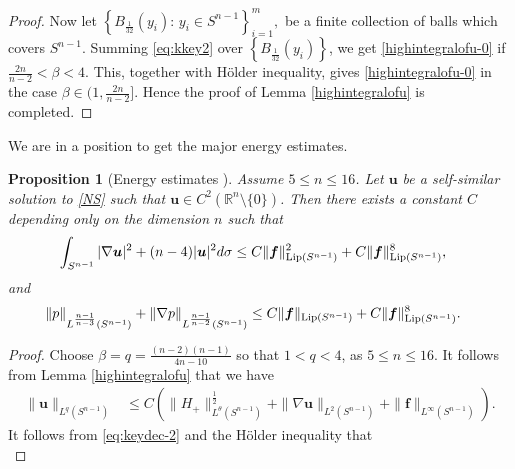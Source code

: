 \documentclass[12pt]{amsart}
\newtheorem{pro}[theorem]{Proposition}
\newcommand{\Bu}{{\boldsymbol{u}}}
\newcommand{\Bf}{{\boldsymbol{f}}}
\begin{document}
{\begin{proof}
		
		Now let $\left\{B_{\frac{1}{32}}(y_i): \, y_i 
		\in S^{n-1}\right\}_{i=1}^{m}, $ be a finite collection of balls which covers $S^{n-1}$. Summing \eqref{eq:kkey2} over $\left\{B_{\frac{1}{32}}(y_i)\right\}$, we get \eqref{highintegralofu-0} if $\frac{2n}{n-2}< \beta< 4$. This, together with H\"older inequality, gives \eqref{highintegralofu-0} in the case $\beta \in(1,  \frac{2n}{n-2}]$. Hence the proof of Lemma \ref{highintegralofu} is completed.
	\end{proof}
	
	
	
	
	
	We are in a position to get the major energy estimates.     
	\begin{pro}
		[Energy estimates ]\label{Energy estimates2}
		Assume $5\leq n\leq 16$. Let
		$\Bu$ be a  self-similar solution to \eqref{NS} such that $\Bu \in C^2(\mathbb{R}^n \setminus\{0\})$. Then there exists a constant $C$ depending only on the dimension $n$ such that
		\begin{equation}\label{eq:energyes3}
			\begin{aligned}
				\int_{S^{n-1}} |\nabla \Bu|^2 +(n-4)|\Bu|^2  d \sigma &\leq C \|\Bf\|_{\textnormal{Lip}(S^{n-1})}^2 + C \|\Bf\|_{\textnormal{Lip}(S^{n-1})}^{8},
			\end{aligned}
		\end{equation}
		and
		\begin{equation}\label{eq:energyes4}
			\begin{aligned}
				\| p\|_{L^{\frac{n-1}{n-3}}(S^{n-1})} + \|\nabla p\|_{L^{\frac{n-1}{n-2}}(S^{n-1})} 
				&\leq C \|\Bf\|_{\textnormal{Lip}(S^{n-1})} + C \|\Bf\|_{\textnormal{Lip}(S^{n-1})}^8.
			\end{aligned}
		\end{equation}
	\end{pro}
	\begin{proof}
		Choose $\beta=q=\frac{(n-2)(n-1)}{4n-10}$ so that $1< q < 4$, as $5\leq n \leq 16$. It follows from Lemma \ref{highintegralofu} that we have
		\begin{equation}\label{eq:kkey1}
			\begin{aligned}
				\|\Bu\|_{L^q(S^{n-1})}&\leq 
				C\left(\|H_{+}\|_{L^{\theta}(S^{n-1})}^{\frac12} +	 \|\nabla \Bu\|_{L^2(S^{n-1})} + \|\Bf\|_{L^{\infty}(S^{n-1})}\right). 
			\end{aligned}
		\end{equation}
		It follows from  \eqref{eq:keydec-2} and the H\"older inequality that 
		\begin{equation}\label{eq:kkey1-1}

\end{equation}
\end{proof}}
\end{document}
